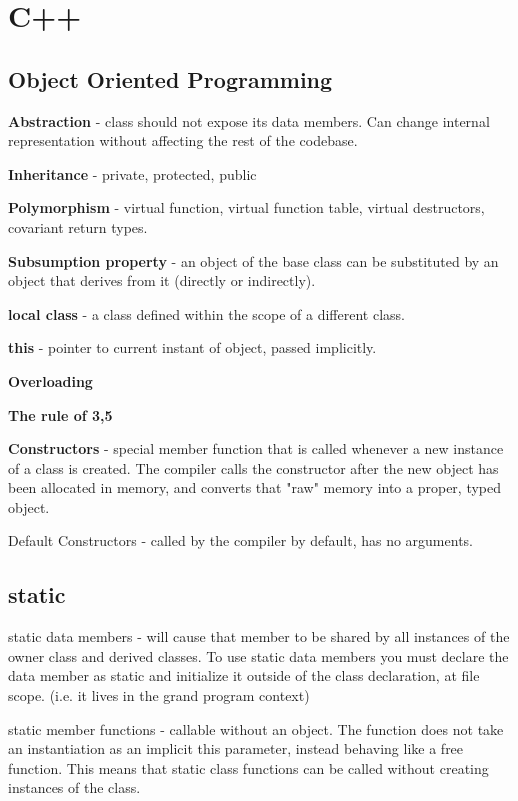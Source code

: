 \section{C++}

\subsection{Object Oriented Programming}

\textbf{Abstraction} - class should not expose its data members. Can change internal representation without affecting the rest of the codebase.

\textbf{Inheritance} - private, protected, public

\textbf{Polymorphism} - virtual function, virtual function table, virtual destructors, covariant return types.
\textbf{}

\textbf{Subsumption property} - an object of the base class can be substituted by an object that derives from it (directly or indirectly).

\textbf{local class} - a class defined within the scope of a different class.

\textbf{this} - pointer to current instant of object, passed implicitly. 

\textbf{Overloading}

\textbf{The rule of 3,5}

\textbf{Constructors} - special member function that is called whenever a new instance of a class is created. The compiler calls the constructor after the new object has been allocated in memory, and converts that "raw" memory into a proper, typed object. 

Default Constructors - called by the compiler by default, has no arguments.

\subsection{static}


static data members -  will cause that member to be shared by all instances of the owner class and derived classes. To use static data members you must declare the data member as static and initialize it outside of the class declaration, at file scope. (i.e. it lives in the grand program context)

static member functions - callable without an object. The function does not take an instantiation as an implicit this parameter, instead behaving like a free function. This means that static class functions can be called without creating instances of the class.

